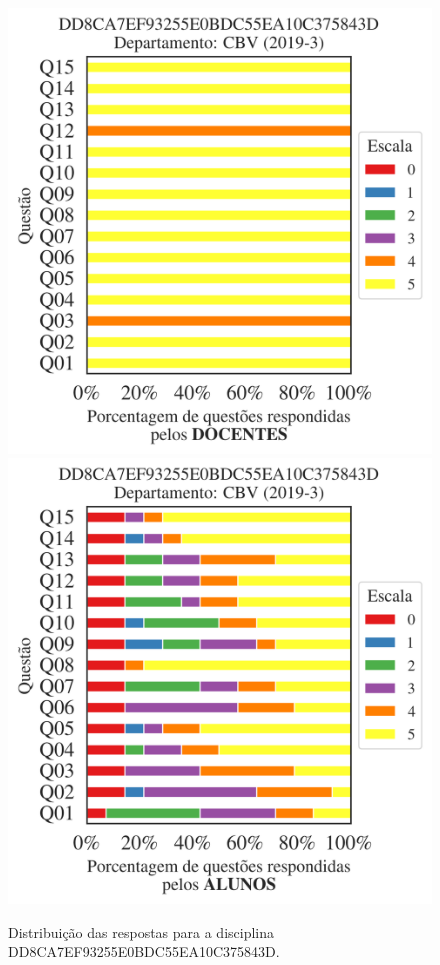 \documentclass[a4paper,10pt]{article}
\begin{document}
\begin{figure}[h]
\centering
\includegraphics[width=0.485\linewidth]{analise_disciplina_departamento_CBV_DD8CA7EF93255E0BDC55EA10C375843D_docentes.png}
\includegraphics[width=0.485\linewidth]{analise_disciplina_departamento_CBV_DD8CA7EF93255E0BDC55EA10C375843D_alunos.png}
\caption{\label{fig:analise_geral_departamento}                Distribuição das respostas para a disciplina DD8CA7EF93255E0BDC55EA10C375843D. }
\end{figure}
\end{document}

